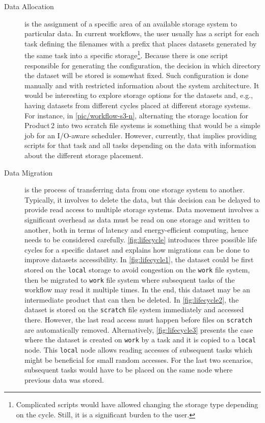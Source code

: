 \documentclass{superfri}
\begin{document}
\begin{description}

\item[Data Allocation] is the assignment of a specific area of an available storage system to particular data.
In current workflows, the user usually has a script for each task defining the filenames with a prefix that places datasets generated by the same task into a specific storage\footnote{Complicated scripts would have allowed changing the storage type depending on the cycle. Still, it is a significant burden to the user.}.
Because there is one script responsible for generating the configuration, the decision in which directory the dataset will be stored is somewhat fixed.
Such configuration is done manually and with restricted information about the system architecture.
It would be interesting to explore storage options for the datasets and, e.g., having datasets from different cycles placed at different storage systems.
For instance, in \cref{pic/workflow-s3-n}, alternating the storage location for Product\,2 into two scratch file systems is something that would be a simple job for an I/O-aware scheduler.
However, currently, that implies providing scripts for that task and all tasks depending on the data with information about the different storage placement.

\item[Data Migration] is the process of transferring data from one storage system to another. Typically, it involves to delete the data, but this decision can be delayed to provide read access to multiple storage systems.
Data movement involves a significant overhead as data must be read on one storage and written to another, both in terms of latency and energy-efficient computing, hence needs to be considered carefully.
\cref{fig:lifecycle} introduces three possible life cycles for a specific dataset and explains how migrations can be done to improve datasets accessibility.
In \cref{fig:lifecycle1}, the dataset could be first stored on the \texttt{local} storage to avoid congestion on the \texttt{work} file system, then be migrated to \texttt{work} file system where subsequent tasks of the workflow may read it multiple times.
In the end, this dataset may be an intermediate product that can then be deleted.
In \cref{fig:lifecycle2}, the dataset is stored on the \texttt{scratch} file system immediately and accessed there.
However, the last read access must happen before files on \texttt{scratch} are automatically removed.
Alternatively, \cref{fig:lifecycle3} presents the case where the dataset is created on \texttt{work} by a task and it is copied to a \texttt{local} node.
This \texttt{local} node allows reading accesses of subsequent tasks which might be beneficial for small random accesses.
For the last two scenarios, subsequent tasks would have to be placed on the same node where previous data was stored.


\end{description}
\end{document}
